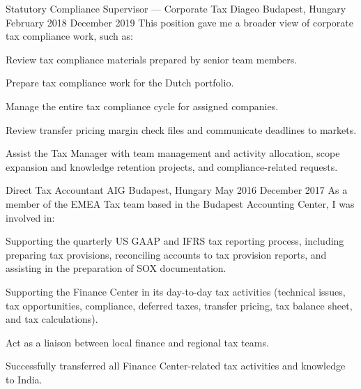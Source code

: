 \begin{cventries}

  \cventry
    {Statutory Compliance Supervisor — Corporate Tax} %
    {Diageo} %
    {Budapest, Hungary} %
    {February 2018 \textendash December 2019} %
    {This position gave me a broader view of corporate tax compliance work, such as:} %
    {
      \begin{cvitems} %
        \item {Review tax compliance materials prepared by senior team members.}
        \item {Prepare tax compliance work for the Dutch portfolio.}
        \item {Manage the entire tax compliance cycle for assigned companies.}
        \item {Review transfer pricing margin check files and communicate deadlines to markets.}
        \item {Assist the Tax Manager with team management and activity allocation, scope expansion and knowledge retention projects, and compliance-related requests.}
      \end{cvitems}
    }


  \cventry
    {Direct Tax Accountant} %
    {AIG} %
    {Budapest, Hungary} %
    {May 2016 \textendash December 2017} %
    {As a member of the EMEA Tax team based in the Budapest Accounting Center, I was involved in:} %
    {
      \begin{cvitems} %
        \item {Supporting the quarterly US GAAP and IFRS tax reporting process, including preparing tax provisions, reconciling accounts to tax provision reports, and assisting in the preparation of SOX documentation.}
        \item {Supporting the Finance Center in its day-to-day tax activities (technical issues, tax opportunities, compliance, deferred taxes, transfer pricing, tax balance sheet, and tax calculations).}
        \item {Act as a liaison between local finance and regional tax teams.}
        \item {Successfully transferred all Finance Center-related tax activities and knowledge to India.}
      \end{cvitems}
    }


\end{cventries}
